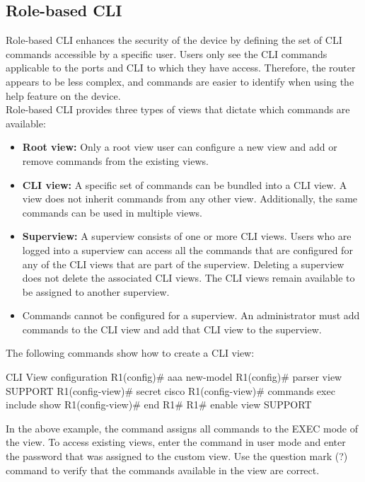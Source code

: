 \subsection{Role-based CLI}

Role-based CLI enhances the security of the device by defining the set of CLI commands accessible by a specific user. Users only see the CLI commands applicable to the ports and CLI to which they have access. Therefore, the router appears to be less complex, and commands are easier to identify when using the help feature on the device.\\

Role-based CLI provides three types of views that dictate which commands are available:

\begin{itemize}
\item \textbf{Root view:} Only a root view user can configure a new view and add or remove commands from the existing views.
\item \textbf{CLI view:} A specific set of commands can be bundled into a CLI view.  A view does not inherit commands from any other view. Additionally, the same commands can be used in multiple views.
\item \textbf{Superview:} A superview consists of one or more CLI views. Users who are logged into a superview can access all the commands that are configured for any of the CLI views that are part of the superview. Deleting a superview does not delete the associated CLI views. The CLI views remain available to be assigned to another superview.
\item \note Commands cannot be configured for a superview. An administrator must add commands to the CLI view and add that CLI view to the superview.
\end{itemize}

The following commands show how to create a CLI view:

\begin{sexylisting}{CLI View configuration}
R1(config)# aaa new-model
R1(config)# parser view SUPPORT
R1(config-view)# secret cisco
R1(config-view)# commands exec include show
R1(config-view)# end
R1#
R1# enable view SUPPORT
\end{sexylisting}

In the above example, the  command assigns all  commands to the EXEC mode of the view. To access existing views, enter the  command in user mode and enter the password that was assigned to the custom view. Use the question mark (?) command to verify that the commands available in the view are correct.\\

